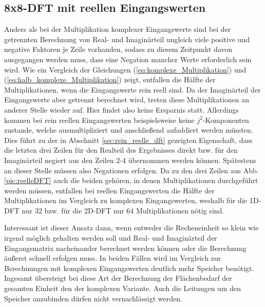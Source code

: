 \subsection{8x8-DFT mit reellen Eingangswerten}\label{sec:RelleEingangswerte}
Anders als bei der Multiplikation komplexer Eingangswerte sind bei der getrennten Berechnung von Real- und Imaginärteil ungleich viele positive 
und negative Faktoren je Zeile vorhanden, sodass zu diesem Zeitpunkt davon ausgegangen werden muss, dass eine Negation mancher Werte erforderlich sein wird. 
Wie ein Vergleich der Gleichungen (\ref{eq:komplexe_Multiplikation}) und (\ref{eq:halb_komplexe_Multiplikation}) zeigt, entfallen die Hälfte der Multiplikationen, wenn die
Eingangswerte rein reell sind. Da der Imaginärteil der Eingangswerte aber getrennt berechnet wird, treten diese Multiplikationen an anderer Stelle wieder auf.
Hier findet also keine Ersparnis statt.
Allerdings kommen bei rein reellen Eingangswerten beispielsweise keine $j^2$-Komponenten zustande, welche ausmultipliziert und anschließend aufaddiert werden müssten. 
Dies führt zu der in Abschnitt \ref{sec:rein_reelle_dft} gezeigten Eigenschaft, dass die letzten drei Zeilen für den Realteil des Ergebnisses direkt bzw. für den Imaginärteil 
negiert aus den Zeilen 2-4 übernommen werden können. Spätestens an dieser Stelle müssen also Negationen erfolgen.
Da zu den drei Zeilen aus Abb. \ref{pic:reelleDFT} auch die beiden gehören, in denen Multiplikationen durchgeführt werden müssen, entfallen bei reellen Eingangswerten die 
Hälfte der Multiplikationen im Vergleich zu komplexen Eingangswerten, weshalb für die 1D-DFT nur $32$ bzw. für die 2D-DFT nur $64$ Multiplikationen nötig sind.

Interessant ist dieser Ansatz dann, wenn entweder die Recheneinheit so klein wie irgend möglich gehalten werden soll und Real- und Imaginärteil der Eingangsmatrix nacheinander
berechnet werden können oder die Berechnung äußerst schnell erfolgen muss. In beiden Fällen wird im Vergleich zur Berechnungen mit komplexen Eingangswerten deutlich mehr
Speicher benötigt.
Ingesamt übersteigt bei diese Art der Berechnung der Flächenbedarf der gesamten Einheit den der komplexen Variante. Auch die Leitungen um den Speicher anzubinden dürfen 
nicht vernachlässigt werden.



